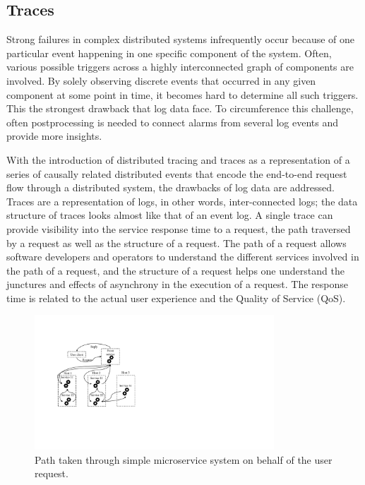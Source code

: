 \subsection{Traces}
Strong failures in complex distributed systems infrequently occur because of one particular event happening in one specific component of the system. Often, various possible triggers across a highly interconnected graph of components are involved. By solely observing discrete events that occurred in any given component at some point in time, it becomes hard to determine all such triggers. This the strongest drawback that log data face. To circumference this challenge, often postprocessing is needed to connect alarms from several log events and provide more insights. 

With the introduction of distributed tracing and traces as a representation of a series of causally related distributed events that encode the end-to-end request flow through a distributed system, the drawbacks of log data are addressed. Traces are a representation of logs, in other words, inter-connected logs; the data structure of traces looks almost like that of an event log. A single trace can provide visibility into the service response time to a request, the path traversed by a request as well as the structure of a request. The path of a request allows software developers and operators to understand the different services involved in the path of a request, and the structure of a request helps one understand the junctures and effects of asynchrony in the execution of a request. The response time is related to the actual user experience and the Quality of Service (QoS).

\begin{figure}[!t]
\centerline{\includegraphics[width=0.8\textwidth]{gfx/chap2/pathmicroservice.pdf}}
\caption{Path taken through simple microservice system on behalf of the user request.}
\label{fig:pathmicroservice}
\end{figure}

